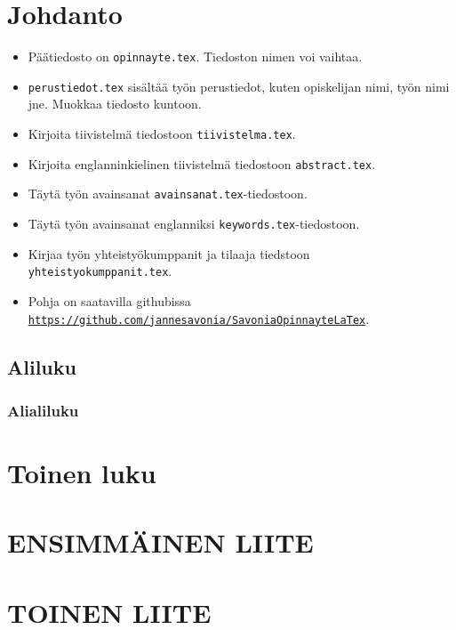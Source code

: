 



\usepackage{hyperref}







\section{Johdanto}
\begin{itemize}
\item Päätiedosto on \texttt{opinnayte.tex}. Tiedoston nimen voi vaihtaa.
\item \texttt{perustiedot.tex} sisältää työn perustiedot, kuten opiskelijan nimi, työn nimi jne. Muokkaa tiedosto kuntoon.
\item Kirjoita tiivistelmä tiedostoon \texttt{tiivistelma.tex}.
\item Kirjoita englanninkielinen tiivistelmä tiedostoon \texttt{abstract.tex}.
\item Täytä työn avainsanat \texttt{avainsanat.tex}-tiedostoon.
\item Täytä työn avainsanat englanniksi \texttt{keywords.tex}-tiedostoon.
\item Kirjaa työn yhteistyökumppanit ja tilaaja tiedstoon \texttt{yhteistyokumppanit.tex}.
\item Pohja on saatavilla githubissa \href{https://github.com/jannesavonia/SavoniaOpinnayteLaTex}{\texttt{https://github.com/jannesavonia/SavoniaOpinnayteLaTex}}. 
\end{itemize}

\subsection{Aliluku}

\subsubsection{Alialiluku}

\section{Toinen luku}

\pagebreak
\appendix

\section{ENSIMMÄINEN LIITE}

\section{TOINEN LIITE}


